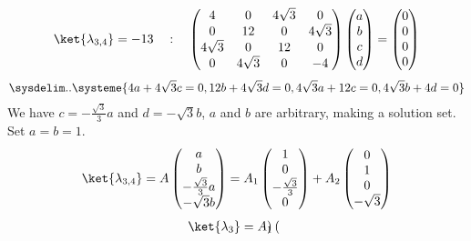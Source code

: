\documentclass{article}
\begin{document}
\begin{enumerate}
		\begin{align}
			\ket{\lambda_{3,4}} = -13 \quad : \quad
			\begin{pmatrix}
				4 & 0 & 4\sqrt{3} & 0 \\
				0 & 12 & 0 & 4\sqrt{3} \\
				4\sqrt{3} & 0 & 12 & 0 \\
				0 & 4\sqrt{3} & 0 & -4
			\end{pmatrix}
			\begin{pmatrix}
				a \\
				b \\
				c \\
				d
			\end{pmatrix}
			= \begin{pmatrix}
				0 \\
				0 \\
				0 \\
				0
			\end{pmatrix}
		\end{align}
		\begin{equation}
			\sysdelim..\systeme{
				4a + 4\sqrt{3}c = 0,
				12b + 4\sqrt{3}d = 0,
				4\sqrt{3}a + 12c = 0,
				4\sqrt{3}b + 4d = 0
			}
		\end{equation}
		We have $c = -\frac{\sqrt{3}}{3}a$ and $d = -\sqrt{3}b$, $a$ and $b$ are arbitrary, making a solution set. Set $a=b=1$.
		\begin{equation}
			\ket{\lambda_{3,4}} = A \begin{pmatrix}
				a \\
				b \\
				-\frac{\sqrt{3}}{3}a \\
				-\sqrt{3}b
			\end{pmatrix}
			= A_1 \begin{pmatrix}
				1 \\
				0 \\
				-\frac{\sqrt{3}}{3} \\
				0
			\end{pmatrix} + A_2 \begin{pmatrix}
				0 \\
				1 \\
				0 \\
				-\sqrt{3}
			\end{pmatrix}
		\end{equation}
		\begin{equation}
			\begin{split}
				\ket{\lambda_3} &= A_1 \begin{pmatrix}

\end{pmatrix}
\end{split}
\end{equation}
\end{enumerate}
\end{document}
